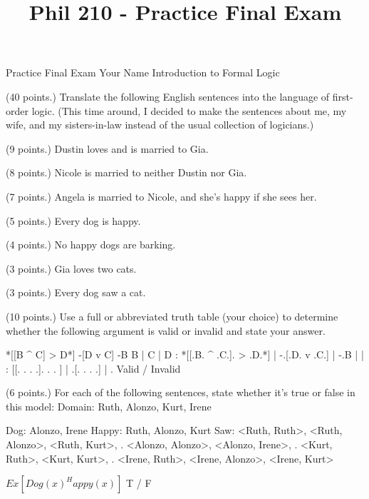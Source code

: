 
\title{Phil 210 - Practice Final Exam}

\heading
Practice Final Exam
Your Name
Introduction to Formal Logic
\endheading

(40 points.) Translate the following English sentences into the language of first-order logic. (This time around, I decided to make the sentences about me, my wife, and my sisters-in-law instead of the usual collection of logicians.)

\quantifiers
\problems
{} (9 points.)
Dustin loves and is married to Gia.
	\answer
	$ $
	\endanswer

 (8 points.)
Nicole is married to neither Dustin nor Gia.
	\answer
	$ $
	\endanswer

 (7 points.)
Angela is married to Nicole, and she's happy if she sees her.
	\answer
	$ $
	\endanswer

 (5 points.)
Every dog is happy.
	\answer
	$ $
	\endanswer

 (4 points.)
No happy dogs are barking.
	\answer
	$ $
	\endanswer

 (3 points.)
Gia loves two cats.
	\answer
	$ $
	\endanswer

 (3 points.)
Every dog saw a cat.
	\answer
	$ $
	\endanswer

\endproblems

(10 points.) Use a full or abbreviated truth table (your choice) to determine whether the following argument is valid or invalid and state your answer.

\problems
{}
\argument
 *[[B ^ C] > D*]
 -[D v C]
\argumentline
 -B
\endargument
	\answer
	\truthtable
	 B | C | D : *[[.B. ^ .C.]. > .D.*] | -.[.D. v .C.] | -.B
	\truthtableline
	   |   |   :  [[. .   . .].   . . ] |  .[. .   . .] |  . 
	\endtruthtable
	Valid / Invalid
	\endanswer

\endproblems

(6 points.) For each of the following sentences, state whether it's true or false in this model:
\answer
	\firstordermodel 
	Domain: Ruth, Alonzo, Kurt, Irene

	Dog:    Alonzo, Irene
	Happy:  Ruth, Alonzo, Kurt
	Saw:    <Ruth, Ruth>, <Ruth, Alonzo>, <Ruth, Kurt>,
	   .    <Alonzo, Alonzo>, <Alonzo, Irene>,
	   .    <Kurt, Ruth>, <Kurt, Kurt>,
	   .    <Irene, Ruth>, <Irene, Alonzo>, <Irene, Kurt>
	\endfirstordermodel
\endanswer\bigskip

\problems
{}
$ Ex[Dog(x) ^ Happy(x)] $
	\answer
	 T / F
	\endanswer

